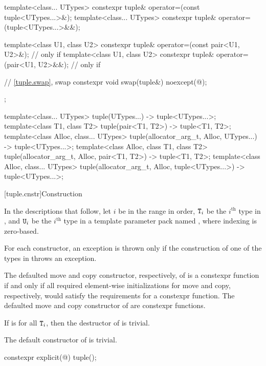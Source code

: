 \begin{codeblock}
{{    template<class... UTypes>
      constexpr tuple& operator=(const tuple<UTypes...>&);
    template<class... UTypes>
      constexpr tuple& operator=(tuple<UTypes...>&&);

    template<class U1, class U2>
      constexpr tuple& operator=(const pair<U1, U2>&);          // only if 
    template<class U1, class U2>
      constexpr tuple& operator=(pair<U1, U2>&&);               // only if 

    // \ref{tuple.swap},  swap
    constexpr void swap(tuple&) noexcept(@\seebelow@);
  };

  template<class... UTypes>
    tuple(UTypes...) -> tuple<UTypes...>;
  template<class T1, class T2>
    tuple(pair<T1, T2>) -> tuple<T1, T2>;
  template<class Alloc, class... UTypes>
    tuple(allocator_arg_t, Alloc, UTypes...) -> tuple<UTypes...>;
  template<class Alloc, class T1, class T2>
    tuple(allocator_arg_t, Alloc, pair<T1, T2>) -> tuple<T1, T2>;
  template<class Alloc, class... UTypes>
    tuple(allocator_arg_t, Alloc, tuple<UTypes...>) -> tuple<UTypes...>;
}
\end{codeblock}

[tuple.cnstr]{Construction}

\pnum
In the descriptions that follow, let $i$ be in the range
 in order, $\texttt{T}_i$
be the $i^\text{th}$ type in , and
$\texttt{U}_i$ be the $i^\text{th}$ type in a template parameter pack named , where indexing
is zero-based.

\pnum
For each  constructor, an exception is thrown only if the construction of
one of the types in  throws an exception.

\pnum
The defaulted move and copy constructor, respectively, of
 is a constexpr function if and only if all
required element-wise initializations for move and copy, respectively,
would satisfy the requirements for a constexpr function. The
defaulted move and copy constructor of  are
constexpr functions.

\pnum
If  is  for all $\texttt{T}_i$,
then the destructor of  is trivial.

\pnum
The default constructor of  is trivial.

%
\begin{itemdecl}
constexpr explicit(@\seebelow@) tuple();
\end{itemdecl}

